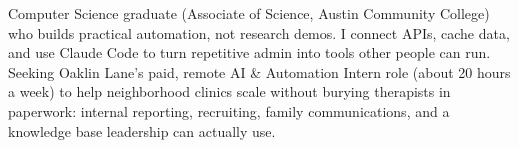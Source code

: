 \documentclass[11pt,a4paper,sans]{moderncv}
\begin{document}

\makecvtitle


\vspace{6pt}
\small{Computer Science graduate (Associate of Science, Austin Community College) who builds practical automation, not research demos. I connect APIs, cache data, and use Claude Code to turn repetitive admin into tools other people can run. Seeking Oaklin Lane's paid, remote AI \& Automation Intern role (about 20 hours a week) to help neighborhood clinics scale without burying therapists in paperwork: internal reporting, recruiting, family communications, and a knowledge base leadership can actually use.}

\end{document}
